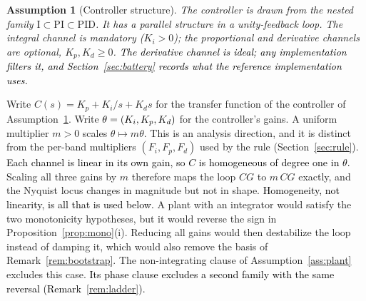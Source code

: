 \documentclass[final,3p,times,twocolumn]{elsarticle}
\newcommand{\fix}[1]{#1}  %
\newcommand{\new}[1]{\textcolor{black}{#1}}  %
\newtheorem{assumption}{Assumption}
\begin{document}
\begin{assumption}[Controller structure]\label{ass:pid}
The controller is drawn from the nested family
$\mathrm{I} \subset \mathrm{PI} \subset \mathrm{PID}$. It has a
parallel structure in a unity-feedback loop. The integral channel is
mandatory ($K_i > 0$); the proportional and derivative channels are
optional, $K_p, K_d \ge 0$. \new{The derivative channel is ideal; any implementation
filters it, and Section~\ref{sec:battery} records what the reference
implementation uses.}
\end{assumption}

Write $C(s) = K_p + K_i/s + K_d s$ for the transfer function of the
controller of Assumption~\ref{ass:pid}.
Write $\theta = \new{(K_i, K_p, K_d)}$ for the controller's gains. A
uniform multiplier $m>0$ scales $\theta \mapsto m\theta$. This is an
analysis direction, and it is distinct from the per-band multipliers
$(F_i, F_p, F_d)$ used by the rule (Section~\ref{sec:rule}). \new{Each
channel is linear in its own gain, so $C$ is homogeneous of degree one
in $\theta$.} Scaling all three gains by $m$ therefore maps the loop
$CG$ to $m\,CG$ exactly, and the Nyquist locus changes in magnitude but
not in shape. \new{Homogeneity, not linearity, is all that is used
below.} A plant with an integrator
would satisfy the two monotonicity hypotheses, but it would reverse the
sign in Proposition~\ref{prop:mono}(i). Reducing all gains would then
destabilize the loop instead of damping it, which would also remove the
basis of Remark~\ref{rem:bootstrap}. The \fix{non-integrating clause of
Assumption~\ref{ass:plant}} excludes this case. \new{Its phase clause
excludes a second family with the same reversal
(Remark~\ref{rem:ladder}).}
\end{document}
